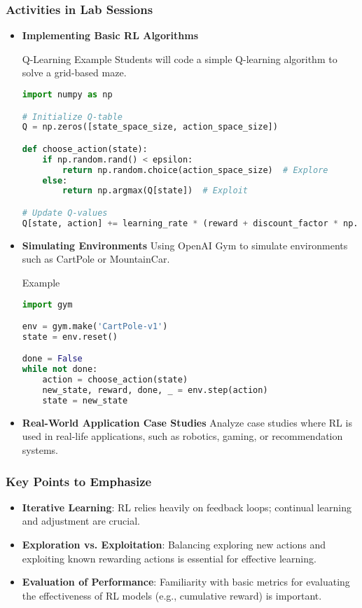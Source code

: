 \documentclass[aspectratio=169]{beamer}
\begin{document}
\begin{frame}[fragile]
    \frametitle{Activities in Lab Sessions}
    \begin{itemize}
        \item \textbf{Implementing Basic RL Algorithms}
        \begin{block}{Q-Learning Example}
            Students will code a simple Q-learning algorithm to solve a grid-based maze.
            \begin{lstlisting}[language=Python]
import numpy as np

# Initialize Q-table
Q = np.zeros([state_space_size, action_space_size])

def choose_action(state):
    if np.random.rand() < epsilon:
        return np.random.choice(action_space_size)  # Explore
    else:
        return np.argmax(Q[state])  # Exploit

# Update Q-values
Q[state, action] += learning_rate * (reward + discount_factor * np.max(Q[new_state]) - Q[state, action])
            \end{lstlisting}
        \end{block}
        
        \item \textbf{Simulating Environments}
        Using OpenAI Gym to simulate environments such as CartPole or MountainCar.
        \begin{block}{Example}
            \begin{lstlisting}[language=Python]
import gym

env = gym.make('CartPole-v1')
state = env.reset()

done = False
while not done:
    action = choose_action(state)
    new_state, reward, done, _ = env.step(action)
    state = new_state
            \end{lstlisting}
        \end{block}

        \item \textbf{Real-World Application Case Studies}
        Analyze case studies where RL is used in real-life applications, such as robotics, gaming, or recommendation systems.
    \end{itemize}
\end{frame}

\begin{frame}[fragile]
    \frametitle{Key Points to Emphasize}
    \begin{itemize}
        \item \textbf{Iterative Learning}: RL relies heavily on feedback loops; continual learning and adjustment are crucial.
        \item \textbf{Exploration vs. Exploitation}: Balancing exploring new actions and exploiting known rewarding actions is essential for effective learning.
        \item \textbf{Evaluation of Performance}: Familiarity with basic metrics for evaluating the effectiveness of RL models (e.g., cumulative reward) is important.
    \end{itemize}
\end{frame}
\end{document}
